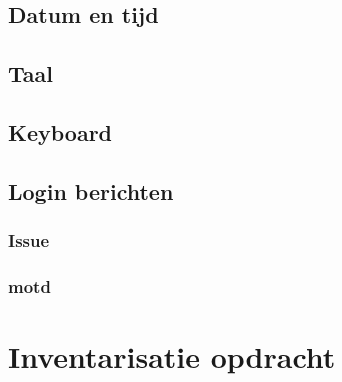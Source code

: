 \documentclass[a4paper,12pt,twoside,openright,titlepage]{book}
\begin{document}
\subsection{Datum en tijd}

\subsection{Taal}

\subsection{Keyboard}


\subsection{Login berichten}
\subsubsection{Issue}

\subsubsection{motd}


\section{Inventarisatie opdracht}


\backmatter
\printindex
\end{document}
